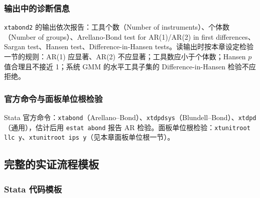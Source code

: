 \subsubsection{输出中的诊断信息}

\texttt{xtabond2} 的输出依次报告：工具个数（Number of instruments）、个体数（Number of groups）、Arellano-Bond test for AR(1)/AR(2) in first differences、Sargan test、Hansen test、Difference-in-Hansen tests。读输出时按本章设定检验一节的规则：AR(1) 应显著、AR(2) 不应显著；工具数应小于个体数；Hansen $p$ 值合理且不接近 1；系统 GMM 的水平工具子集的 Difference-in-Hansen 检验不应拒绝。

\subsubsection{官方命令与面板单位根检验}

Stata 官方命令：\texttt{xtabond}（Arellano--Bond）、\texttt{xtdpdsys}（Blundell--Bond）、\texttt{xtdpd}（通用），估计后用 \texttt{estat abond} 报告 AR 检验。面板单位根检验：\texttt{xtunitroot llc y}、\texttt{xtunitroot ips y}（见本章面板单位根一节）。

\subsection{完整的实证流程模板}

\subsubsection{Stata 代码模板}

